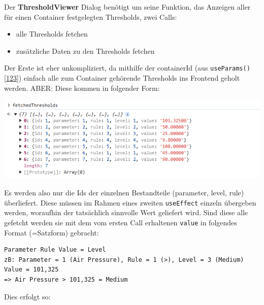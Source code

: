 \documentclass[
    headings=optiontotocandhead,%
    twoside,
    numbers=noenddot,%
    12pt, %
    titlepage, %
    parskip=full, %
    listof=leveldown, 
    numbers=noenddot, %
    a4paper,DIV=14,
    BCOR=15mm,
]{scrbook}
\newcommand{\passthrough}[1]{#1}
\let\origfigure=\figure
\let\endorigfigure=\endfigure
\renewenvironment{figure}[1][]{%
   \origfigure[H]
}{%
   \endorigfigure
}
\providecommand{\tightlist}{%
  \setlength{\itemsep}{0pt}\setlength{\parskip}{0pt}}
\begin{document}
Der \textbf{ThresholdViewer} Dialog benötigt um seine Funktion, das
Anzeigen aller für einen Container festgelegten Thresholds, zwei Calls:

\begin{itemize}
\tightlist
\item
  alle Thresholds fetchen
\item
  zusätzliche Daten zu den Thresholds fetchen
\end{itemize}

Der Erste ist eher unkompliziert, da mithilfe der containerId (aus
\passthrough{\lstinline!useParams()!}
{[}\protect\hyperlink{ref-Refine-ReactRouter}{123}{]}) einfach alle zum
Container gehörende Thresholds ins Frontend geholt werden. ABER: Diese
kommen in folgender Form:

\begin{figure}
\centering
\includegraphics{img/Gekle/ThresholdsByBackend.png}
\caption{Form, in welcher die aus dem Backend gefetchten Thresholds sich
befinden}
\end{figure}

Es werden also nur die Ids der einzelnen Bestandteile (parameter, level,
rule) überliefert. Diese müssen im Rahmen eines zweiten
\passthrough{\lstinline!useEffect!} einzeln übergeben werden, woraufhin
der tatsächlich sinnvolle Wert geliefert wird. Sind diese alle gefetcht
werden sie mit dem vom ersten Call erhaltenen
\passthrough{\lstinline!value!} in folgendes Format (=Satzform)
gebracht:

\begin{lstlisting}[caption={Verwandlung der Threshold Daten aus dem Backend in die Satzform}]
Parameter Rule Value = Level
zB: Parameter = 1 (Air Pressure), Rule = 1 (>), Level = 3 (Medium) Value = 101,325
=> Air Pressure > 101,325 = Medium
\end{lstlisting}

Dies erfolgt so:
\end{document}

